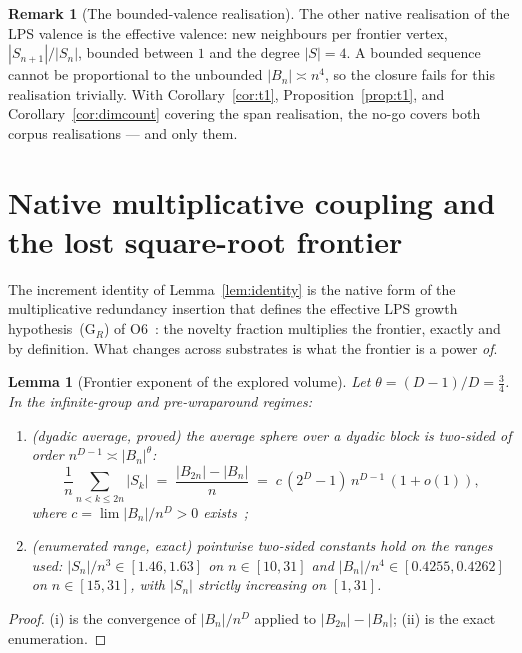 \documentclass[11pt,a4paper]{article}
\newtheorem{lemma}[theorem]{Lemma}
\theoremstyle{definition}
\newtheorem{remark}[theorem]{Remark}
\begin{document}
\begin{remark}[The bounded-valence realisation]
  \label{rem:bounded-valence}
  The other native realisation of the LPS valence is the effective valence: new neighbours per frontier
  vertex, $|S_{n+1}|/|S_n|$, bounded between $1$ and the degree $|S| = 4$.
  A bounded sequence cannot be proportional to the unbounded $|B_n| \asymp n^4$, so the closure fails for
  this realisation trivially.
  With Corollary~\ref{cor:t1}, Proposition~\ref{prop:t1}, and Corollary~\ref{cor:dimcount} covering the
  span realisation, the no-go covers both corpus realisations --- and only them.
\end{remark}

\section{Native multiplicative coupling and the lost square-root frontier}
\label{sec:coupling}

The increment identity of Lemma~\ref{lem:identity} is the native form of the multiplicative redundancy
insertion that defines the effective LPS growth hypothesis~(G$_R$) of O6~\cite{Beau2026a10}: the novelty
fraction multiplies the frontier,
exactly and by definition.
What changes across substrates is what the frontier is a power \emph{of}.

\begin{lemma}[Frontier exponent of the explored volume]
  \label{lem:theta}
  Let $\theta = (D-1)/D = \tfrac{3}{4}$.
  In the infinite-group and pre-wrap\-around regimes:
  \begin{enumerate}[label=(\roman*)]
    \item (dyadic average, proved) the average sphere over a dyadic block is two-sided of order
      $n^{D-1} \asymp |B_n|^{\theta}$:
      \[
        \frac{1}{n} \sum_{n < k \le 2n} |S_k|
        \;=\; \frac{|B_{2n}| - |B_n|}{n}
        \;=\; c\,(2^D - 1)\, n^{D-1}\,(1 + o(1)),
      \]
      where $c = \lim |B_n|/n^D > 0$ exists~\cite{Pansu1983};
    \item (enumerated range, exact) pointwise two-sided constants hold on the ranges used:
      $|S_n|/n^3 \in [1.46, 1.63]$ on $n \in [10, 31]$ and $|B_n|/n^4 \in [0.4255, 0.4262]$ on
      $n \in [15, 31]$, with $|S_n|$ strictly increasing on $[1, 31]$.
  \end{enumerate}
\end{lemma}

\begin{proof}
  (i) is the convergence of $|B_n|/n^D$ applied to $|B_{2n}| - |B_n|$; (ii) is the exact enumeration.
\end{proof}
\end{document}

